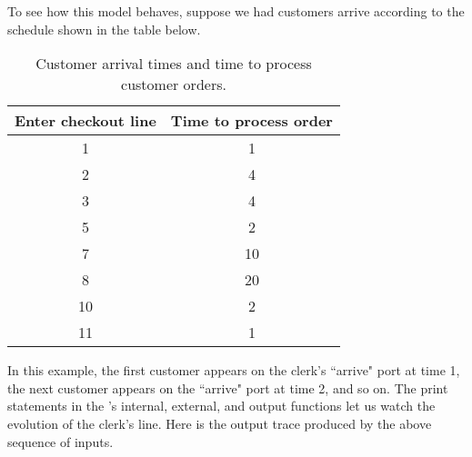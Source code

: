 To see how this model behaves, suppose we had customers arrive
according to the schedule shown in the table below.
\begin{table}
\centering
\begin{tabular}{|c|c|}
\hline
Enter checkout line & Time to process order \\ \hline
1 & 1 \\ \hline
2 & 4 \\ \hline
3 & 4 \\ \hline
5 & 2 \\ \hline
7 & 10 \\ \hline
8 & 20 \\ \hline
10 & 2 \\ \hline
11 & 1 \\ \hline
\end{tabular}
\caption{Customer arrival times and time to process customer orders.}
\label{tab:customer_data}
\end{table}
In this example, the first customer appears on the clerk's
``arrive" port at time 1, the next customer appears on the
``arrive" port at time 2, and so on. The print
statements in the 's internal, external, and output
functions let us watch the evolution of the
clerk's line. Here is the output trace produced by the above sequence
of inputs.
